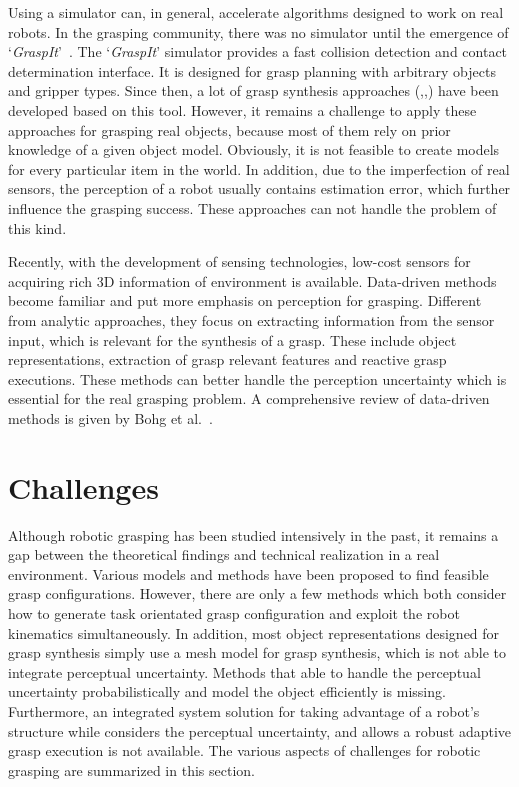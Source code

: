 Using a simulator can, in general, accelerate algorithms designed to work on real robots. In the grasping community, there was no simulator until the emergence of `\textit{GraspIt}'~\cite{Miller2004}.  The `\textit{GraspIt}' simulator provides a fast collision detection and contact determination interface. It is designed for grasp planning with arbitrary objects and gripper types. Since then, a lot of grasp synthesis approaches (\cite{Miller1999},\cite{Kragic2001},\cite{Miller2003}) have been developed based on this tool. However, it remains a challenge to apply these approaches for grasping real objects, because most of them rely on prior knowledge of a given object model. Obviously, it is not feasible to create models  for every particular item in the world. In addition, due to the imperfection of real sensors, the perception of a robot usually contains estimation error, which further influence the grasping success. These approaches can not handle the problem of this kind.

Recently, with the development of sensing technologies, low-cost sensors for acquiring rich 3D information of environment is available. Data-driven methods become familiar and put more emphasis on perception for grasping. Different from analytic approaches, they focus on extracting information from the sensor input, which is relevant for the synthesis of a grasp. These include object representations, extraction of grasp relevant features and reactive grasp executions. These methods can better handle the perception uncertainty which is essential for the real grasping problem. A comprehensive review of data-driven methods is given by Bohg et al.~\cite{Bohg2014}.

 
\section{Challenges}
Although robotic grasping has been studied intensively in the past, it remains a gap between the theoretical findings and technical realization in a real environment. Various models and methods have been proposed to  find feasible grasp configurations. However, there are only a few methods which both consider how to generate task orientated grasp configuration and exploit the robot kinematics simultaneously. In addition, most object representations designed for grasp synthesis simply use a mesh model for grasp synthesis, which is not able to integrate perceptual uncertainty. Methods that able to handle the perceptual uncertainty probabilistically and model the object efficiently is missing. Furthermore, an integrated system solution for taking advantage of a robot's structure while considers the perceptual uncertainty, and allows a robust adaptive grasp execution is not available. The various aspects of challenges for robotic grasping are summarized in this section. 

